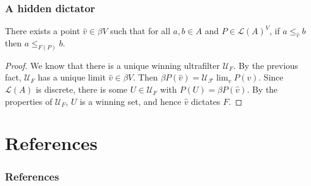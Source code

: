 \documentclass{beamer}
\theoremstyle{definition}
\begin{document}
\begin{frame}
    \frametitle{A hidden dictator}

    \begin{theorem}
        There exists a point $\hat{v} \in \mathit{\beta V}$ such that for all $a, b \in A$ and $P \in \mathcal{L}(A)^V$, if $a \leq_{\hat{v}} b$
        then $a \leq_{F(P)} b$.
    \end{theorem}

    \begin{proof}
        We know that there is a unique winning ultrafilter $\mathcal{U}_F$. By the previous fact, $\mathcal{U}_F$ has a unique limit $\hat{v} \in
        \mathit{\beta V}$. Then $\mathit{\beta P}(\hat{v}) = \mathcal{U_F}\lim_v P(v)$. Since $\mathcal{L}(A)$ is discrete, there is some
        $U \in \mathcal{U}_F$ with $P(U) = \mathit{\beta P}(\hat{v})$. By the properties of $\mathcal{U}_F$, $U$ is a winning set, and hence
        $\hat{v}$ dictates $F$.
    \end{proof}

\end{frame}

\section{References}

\begin{frame}
    \frametitle{References}

    \nocite{*}
    \printbibliography

\end{frame}
\end{document}
